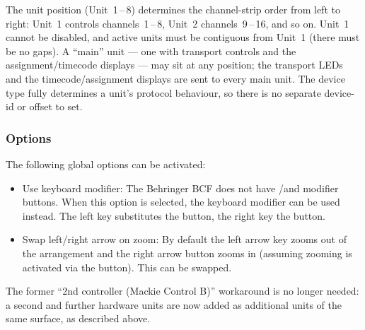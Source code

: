 The unit position (Unit~1\,--\,8) determines the channel-strip order
from left to right: Unit~1 controls channels~1\,--\,8, Unit~2
channels~9\,--\,16, and so on. Unit~1 cannot be disabled, and active
units must be contiguous from Unit~1 (there must be no gaps). A
``main'' unit --- one with transport controls and the
assignment/timecode displays --- may sit at any position; the
transport LEDs and the timecode/assignment displays are sent to every
main unit. The device type fully determines a unit's protocol
behaviour, so there is no separate device-id or offset to set.

\subsubsection{Options}
The following global options can be activated:
\begin{itemize}
\item Use keyboard modifier: The Behringer BCF does not have
  \option/\control and \alt modifier buttons. When this option is
  selected, the keyboard modifier can be used instead. The left
  \alt key substitutes the \alt button, the right \alt key the
  \option button.
\item Swap left/right arrow on zoom: By default the left arrow key
  zooms out of the arrangement and the right arrow button zooms in (assuming
  zooming is activated via the \zoom button). This can be swapped.
\end{itemize}

\noindent
The former ``2nd controller (Mackie Control B)'' workaround is no
longer needed: a second and further hardware units are now added as
additional units of the same surface, as described above.
